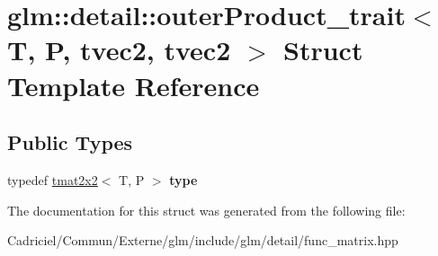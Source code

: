\hypertarget{structglm_1_1detail_1_1outer_product__trait_3_01_t_00_01_p_00_01tvec2_00_01tvec2_01_4}{}\section{glm\+:\+:detail\+:\+:outer\+Product\+\_\+trait$<$ T, P, tvec2, tvec2 $>$ Struct Template Reference}
\label{structglm_1_1detail_1_1outer_product__trait_3_01_t_00_01_p_00_01tvec2_00_01tvec2_01_4}
\subsection*{Public Types}
\begin{DoxyCompactItemize}
\item 
typedef \hyperlink{structglm_1_1detail_1_1tmat2x2}{tmat2x2}$<$ T, P $>$ {\bfseries type}\hypertarget{structglm_1_1detail_1_1outer_product__trait_3_01_t_00_01_p_00_01tvec2_00_01tvec2_01_4_a390fb582fa7caa73e53f69181b3b334e}{}\label{structglm_1_1detail_1_1outer_product__trait_3_01_t_00_01_p_00_01tvec2_00_01tvec2_01_4_a390fb582fa7caa73e53f69181b3b334e}

\end{DoxyCompactItemize}


The documentation for this struct was generated from the following file\+:\begin{DoxyCompactItemize}
\item 
Cadriciel/\+Commun/\+Externe/glm/include/glm/detail/func\+\_\+matrix.\+hpp\end{DoxyCompactItemize}
